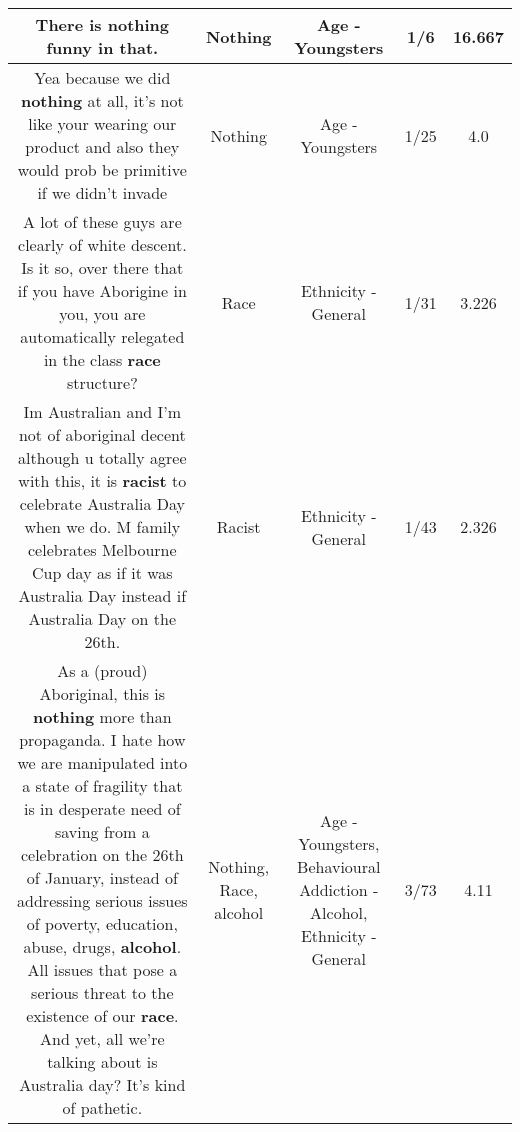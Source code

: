 \documentclass[11pt]{article}
\newlength\mylength
\begin{document}
\begin{center}
\begin{longtable}{|C{.65\mylength}|C{.30\mylength}|C{.12\mylength}|C{.12\mylength}|C{.12\mylength}|}
  \small There is \textbf{nothing} funny in that.\normalsize   & Nothing & Age - Youngsters & 1/6 & 16.667 \\  \hline
  \small Yea because we did \textbf{nothing} at all, it's not like your wearing our product and also they would prob be primitive if we didn't invade\normalsize   & Nothing & Age - Youngsters & 1/25 & 4.0 \\  \hline
  \small A lot of these guys are clearly of white descent. Is it so, over there that if you have Aborigine in you, you are automatically relegated in the class \textbf{race} structure?\normalsize   & Race & Ethnicity - General & 1/31 & 3.226 \\  \hline
  \small Im Australian and I'm not of aboriginal decent although u totally agree with this, it is \textbf{racist} to celebrate Australia Day when we do. M family celebrates Melbourne Cup day as if it was Australia Day instead if Australia Day on the 26th.\normalsize   & Racist & Ethnicity - General & 1/43 & 2.326 \\  \hline
  \small As a (proud) Aboriginal, this is \textbf{nothing} more than propaganda. I hate how we are manipulated into a state of fragility that is in desperate need of saving from a celebration on the 26th of January, instead of addressing serious issues of poverty, education, abuse, drugs, \textbf{alcohol}. All issues that pose a serious threat to the existence of our \textbf{race}. And yet, all we're talking about is Australia day? It's kind of pathetic.\normalsize   & Nothing, Race, alcohol & Age - Youngsters, Behavioural Addiction - Alcohol, Ethnicity - General & 3/73 & 4.11 \\  \hline

\end{longtable}
\end{center}
\end{document}
